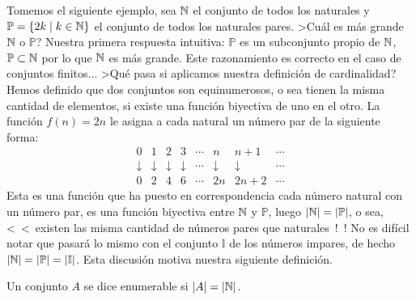 Tomemos el siguiente ejemplo, sea $\mathbb{N}$ el conjunto de todos los naturales y $\mathbb P=\{2k\;|\;k\in\mathbb{N}\}$ el conjunto de todos los naturales pares.
>Cuál es más grande $\mathbb{N}$ o $\mathbb P$?
Nuestra primera respuesta intuitiva: $\mathbb P$ es un subconjunto propio de $\mathbb{N}$, $\mathbb P\subset\mathbb{N}$ por lo que $\mathbb{N}$ es más grande.
Este razonamiento es correcto en el caso de conjuntos finitos...
>Qué pasa si aplicamos nuestra definición de cardinalidad?
Hemos definido que dos conjuntos son equinumerosos, o sea tienen la misma cantidad de elementos, si existe una función biyectiva de uno en el otro.
La función $f(n)=2n$ le asigna a cada natural un número par de la siguiente forma:
\[
\begin{array}{ccccccccccccccc}
0 & 1 & 2 & 3 & \cdots & n & n+1 & \cdots \\
\downarrow&\downarrow&\downarrow&\downarrow&\cdots&\downarrow&\downarrow&\cdots\\
0 & 2 & 4 & 6 & \cdots & 2n & 2n+2 & \cdots
\end{array}
\]
Esta es una función que ha puesto en correspondencia cada número natural con un número par, es una función biyectiva entre $\mathbb{N}$ y $\mathbb P$, luego $|\mathbb{N}|=|\mathbb P|$, o sea, <~<~existen las misma cantidad de números pares que naturales~!~!
No es difícil notar que pasará lo mismo con el conjunto $\mathbb I$ de los números impares, de hecho $|\mathbb{N}|=|\mathbb P|=|\mathbb I|$.
Esta discusión motiva nuestra siguiente definición.

\begin{definicion}
Un conjunto $A$ se dice enumerable si $|A|=|\mathbb{N}|$.
\end{definicion}

